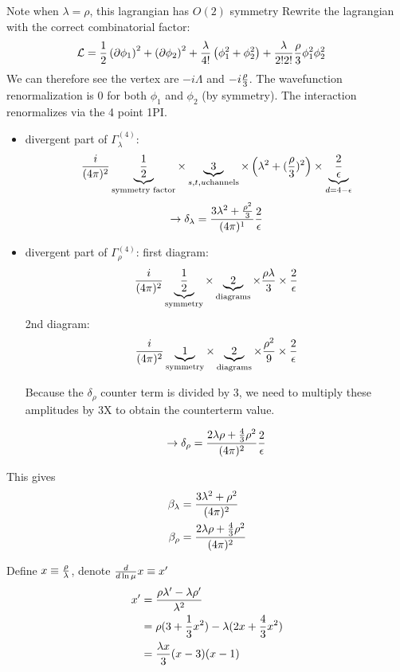 \documentclass[9pt]{scrartcl}
\begin{document}
Note when $\lambda = \rho$, this lagrangian has $O(2)$ symmetry
Rewrite the lagrangian with the correct combinatorial factor:
\begin{align}
	\mathcal{L} & = \frac12 \left(\partial \phi_1 \right)^2 + \left(\partial \phi_2 \right)^2 + {\lambda \over 4!} \left(\phi_1^2 + \phi_2^2 \right) + 
	{\lambda \over 2! 2!} { \rho \over 3} \phi_1^2 \phi_2^2
	\end{align}
We can therefore see the vertex are $-i \Lambda$ and $-i {\rho \over 3} $.
The wavefunction renormalization is 0 for both $\phi_1$ and $\phi_2$ (by symmetry).
The interaction renormalizes via the 4 point 1PI.  
\begin{itemize}
	\item divergent part of $\Gamma_\lambda^{(4)}$:
$$ {i \over (4 \pi)^2} \underbrace{\frac12}_{\text{symmetry factor}} \times \underbrace{3}_{s, t, u \text{channels}} \times
 \left( \lambda^2 + ({\rho \over 3})^2 \right)  \times
 \underbrace{2 \over \epsilon}_{d = 4- \epsilon}$$ 
$$ \rightarrow \delta_\lambda = {3\lambda^2 + {\rho^2 \over 3} \over (4 \pi)^1} {2 \over \epsilon}$$
   \item divergent part of $\Gamma_\rho^{(4)}$:
   first diagram:
   $${i \over (4 \pi)^2} \underbrace{ \frac12}_{\text{symmetry}}  \times \underbrace{2}_{\text{diagrams}} \times
   {\rho \lambda \over 3} \times {2 \over \epsilon}$$
   2nd diagram:
   $${i \over (4 \pi)^2} \underbrace{ 1}_{\text{symmetry}} \times
   \underbrace{2}_{\text{diagrams}} \times
   {\rho^2 \over 9} \times {2 \over \epsilon}$$ 
   
   Because the $\delta_\rho$ counter term is divided by 3, we need to multiply these amplitudes by 3X to obtain the counterterm value.
   
   $$ \rightarrow \delta_\rho = { 2 \lambda \rho + {4 \over 3} \rho^2 \over (4 \pi)^2} {2 \over \epsilon} $$
\end{itemize}

This gives
\begin{align}
	\beta_{\lambda} & = {3 \lambda^2  + {\rho^2} \over (4 \pi)^2} \\
	\beta_{\rho} & = {2 \lambda \rho + {4 \over 3} \rho^2 \over (4 \pi)^2}
	\end{align}

Define $x \equiv {\rho \over \lambda}$, denote ${d \over d \ln\mu} x \equiv x'$
\begin{align}
	x' &= {\rho \lambda' - \lambda \rho' \over \lambda^2} \\
	    &= \rho (3 + {1 \over 3 } x^2) - \lambda (2 x + {4 \over 3} x^2) \\
	    & = {\lambda x \over 3} (x - 3) (x - 1)
	\end{align}
\end{document}
